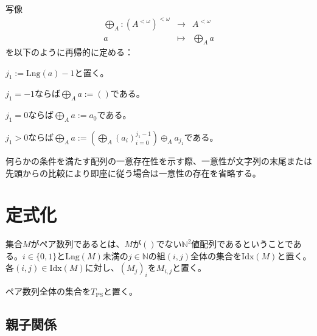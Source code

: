 \documentclass[dvipdfmx,uplatex]{jsarticle}
\theoremstyle{customnonumberbreakfortheorem}
\theoremstyle{customnonumberbreakforproof}
\begin{document}
写像
\begin{eqnarray*}
\bigoplus_A \colon (A^{< \omega})^{< \omega} & \to & A^{< \omega} \\
a & \mapsto & \bigoplus_A a
\end{eqnarray*}
を以下のように再帰的に定める：
\begin{nenumerate}
	\item \(j_1 := \textrm{Lng}(a) - 1\)と置く。
	\item \(j_1 = -1\)ならば\(\bigoplus_A a := ()\)である。
	\item \(j_1 = 0\)ならば\(\bigoplus_A a := a_0\)である。
	\item \(j_1 > 0\)ならば\(\bigoplus_A a := \left( \bigoplus_A (a_i)_{i=0}^{j_1-1} \right) \oplus_A a_{j_1}\)である。
\end{nenumerate}

何らかの条件を満たす配列の一意存在性を示す際、一意性が文字列の末尾または先頭からの比較により即座に従う場合は一意性の存在を省略する。


\section{定式化}

集合\(M\)がペア数列であるとは、\(M\)が\(()\)でない\(\mathbb{N}^2\)値配列であるということである。\(i \in \{0,1\}\)と\(\textrm{Lng}(M)\)未満の\(j \in \mathbb{N}\)の組\((i,j)\)全体の集合を\(\textrm{Idx}(M)\)と置く。各\((i,j) \in \textrm{Idx}(M)\)に対し、\((M_j)_i\)を\(M_{i,j}\)と置く。

ペア数列全体の集合を\(T_{\textrm{PS}}\)と置く。


\subsection{親子関係}
\end{document}

